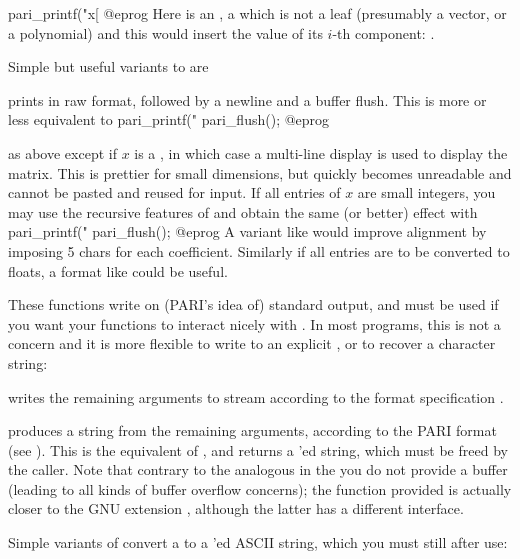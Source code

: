     pari_printf("x[%
@eprog\noindent
Here  is an ,  a  which is not a leaf
(presumably a vector, or a polynomial) and this would insert the value of its
$i$-th  component: .

\noindent Simple but useful variants to  are

 prints  in raw format, followed by a
newline and a buffer flush. This is more or less equivalent to
\bprog
    pari_printf("%
    pari_flush();
@eprog

 as above except if $x$ is a , in which
case a multi-line display is used to display the matrix. This is prettier for
small dimensions, but quickly becomes unreadable and cannot be pasted and
reused for input. If all entries of $x$ are small integers, you may use the
recursive features of  and obtain the same (or better) effect with
\bprog
    pari_printf("%
    pari_flush();
@eprog\noindent
A variant like  would improve alignment by imposing
5 chars for each coefficient. Similarly if all entries are to be converted to
floats, a format like  could be useful.


These functions write on (PARI's idea of) standard output, and must be used
if you want your functions to interact nicely with . In most
programs, this is not a concern and it is more flexible to write to an
explicit , or to recover a character string:

 writes the
remaining arguments to stream  according to the format
specification .

 produces a string from the
remaining arguments, according to the PARI format  (see ).
This is the  equivalent of , and returns a
'ed string, which must be freed by the caller. Note that contrary
to the analogous  in the  you do not provide a buffer
(leading to all kinds of buffer overflow concerns); the function provided is
actually closer to the GNU extension , although the latter has
a different interface.

Simple variants of  convert a  to a
'ed ASCII string, which you must still  after use:

